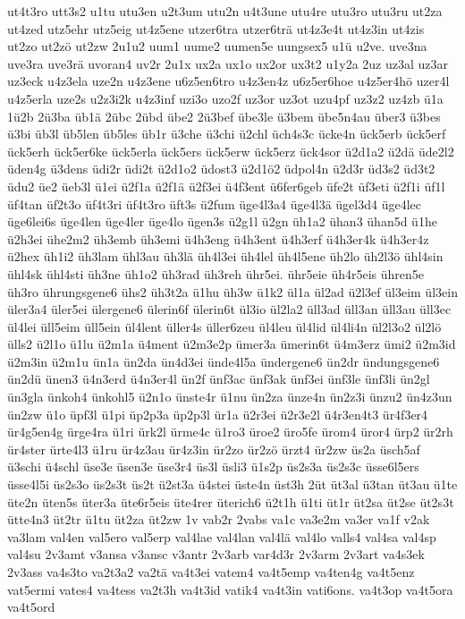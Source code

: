 {ut4t3ro
utt3s2
u1tu
utu3en
u2t3um
utu2n
u4t3une
utu4re
utu3ro
utu3ru
ut2za
ut4zed
utz5ehr
utz5eig
ut4z5ene
utzer6tra
utzer6trä
ut4z3e4t
ut4z3in
ut4zis
ut2zo
ut2zö
ut2zw
2u1u2
uum1
uume2
uumen5e
uungsex5
u1ü
u2ve.
uve3na
uve3ra
uve3rä
uvoran4
uv2r
2u1x
ux2a
ux1o
ux2or
ux3t2
u1y2a
2uz
uz3al
uz3ar
uz3eck
u4z3ela
uze2n
u4z3ene
u6z5en6tro
u4z3en4z
u6z5er6hoe
u4z5er4hö
uzer4l
u4z5erla
uze2s
u2z3i2k
u4z3inf
uzi3o
uzo2f
uz3or
uz3ot
uzu4pf
uz3z2
uz4zb
ü1a
1ü2b
2ü3ba
üb1ä
2übc
2übd
übe2
2ü3bef
übe3le
ü3bem
übe5n4au
über3
ü3bes
ü3bi
üb3l
üb5len
üb5les
üb1r
ü3che
ü3chi
ü2chl
üch4s3c
ücke4n
ück5erb
ück5erf
ück5erh
ück5er6ke
ück5erla
ück5ers
ück5erw
ück5erz
ück4sor
ü2d1a2
ü2dä
üde2l2
üden4g
ü3dens
üdi2r
üdi2t
ü2d1o2
üdost3
ü2d1ö2
üdpol4n
ü2d3r
üd3s2
üd3t2
üdu2
üe2
üeb3l
ü1ei
ü2f1a
ü2f1ä
ü2f3ei
ü4f3ent
ü6fer6geb
üfe2t
üf3eti
ü2f1i
üf1l
üf4tan
üf2t3o
üf4t3ri
üf4t3ro
üft3s
ü2fum
üge4l3a4
üge4l3ä
ügel3d4
üge4lec
üge6lei6s
üge4len
üge4ler
üge4lo
ügen3s
ü2g1l
ü2gn
üh1a2
ühan3
ühan5d
ü1he
ü2h3ei
ühe2m2
üh3emb
üh3emi
ü4h3eng
ü4h3ent
ü4h3erf
ü4h3er4k
ü4h3er4z
ü2hex
üh1i2
üh3lam
ühl3au
üh3lä
üh4l3ei
üh4lel
üh4l5ene
üh2lo
üh2l3ö
ühl4sin
ühl4sk
ühl4sti
üh3ne
üh1o2
üh3rad
üh3reh
ühr5ei.
ühr5eie
üh4r5eis
ühren5e
üh3ro
ührungsgene6
ühs2
üh3t2a
ü1hu
üh3w
ü1k2
ül1a
ül2ad
ü2l3ef
ül3eim
ül3ein
üler3a4
üler5ei
ülergene6
ülerin6f
ülerin6t
ül3io
ül2la2
üll3ad
üll3an
üll3au
üll3ec
ül4lei
üll5eim
üll5ein
ül4lent
üller4s
üller6zeu
ül4leu
ül4lid
ül4li4n
ül2l3o2
ül2lö
ülls2
ü2l1o
ü1lu
ü2m1a
ü4ment
ü2m3e2p
ümer3a
ümerin6t
ü4m3erz
ümi2
ü2m3id
ü2m3in
ü2m1u
ün1a
ün2da
ün4d3ei
ünde4l5a
ündergene6
ün2dr
ündungsgene6
ün2dü
ünen3
ü4n3erd
ü4n3er4l
ün2f
ünf3ac
ünf3ak
ünf3ei
ünf3le
ünf3li
ün2gl
ün3gla
ünkoh4
ünkohl5
ü2n1o
ünste4r
ü1nu
ün2za
ünze4n
ün2z3i
ünzu2
ün4z3un
ün2zw
ü1o
üpf3l
ü1pi
üp2p3a
üp2p3l
ür1a
ü2r3ei
ü2r3e2l
ü4r3en4t3
ür4f3er4
ür4g5en4g
ürge4ra
ü1ri
ürk2l
ürme4c
ü1ro3
üroe2
üro5fe
ürom4
üror4
ürp2
ür2rh
ür4ster
ürte4l3
ü1ru
ür4z3au
ür4z3in
ür2zo
ür2zö
ürzt4
ür2zw
üs2a
üsch5af
ü3schi
ü4schl
üse3e
üsen3e
üse3r4
üs3l
üsli3
ü1s2p
üs2s3a
üs2s3c
üsse6l5ers
üsse4l5i
üs2s3o
üs2s3t
üs2t
ü2st3a
ü4stei
üste4n
üst3h
2üt
üt3al
ü3tan
üt3au
ü1te
üte2n
üten5s
üter3a
üte6r5eis
üte4rer
üterich6
ü2t1h
ü1ti
üt1r
üt2sa
üt2se
üt2s3t
ütte4n3
üt2tr
ü1tu
üt2za
üt2zw
1v
vab2r
2vabs
va1c
va3e2m
va3er
va1f
v2ak
va3lam
val4en
val5ero
val5erp
val4lae
val4lan
val4lä
val4lo
valls4
val4sa
val4sp
val4su
2v3amt
v3ansa
v3ansc
v3antr
2v3arb
var4d3r
2v3arm
2v3art
va4s3ek
2v3ass
va4s3to
va2t3a2
va2tä
va4t3ei
vatem4
va4t5emp
va4ten4g
va4t5enz
vat5ermi
vates4
va4tess
va2t3h
va4t3id
vatik4
va4t3in
vati6ons.
va4t3op
va4t5ora
va4t5ord
}
